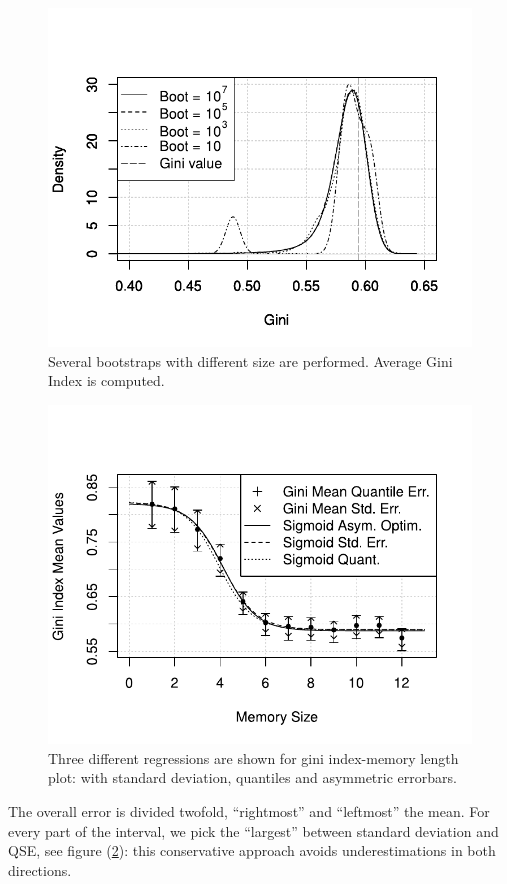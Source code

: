 \begin{figure}[h!]
  \centering
  \includegraphics[width=.8\columnwidth]{img/bootstrap.pdf}
  \caption{Several bootstraps with different size are performed. Average Gini Index is computed.}
  \label{fig:bootstrap}
\end{figure}
\begin{figure}[h!]
  \centering
  \includegraphics[width=.8\columnwidth]{img/appendix.pdf}
  \caption{Three different regressions are shown for gini index-memory length plot: with standard deviation, quantiles and asymmetric errorbars.}
  \label{fig:gausssigma}
\end{figure}
The overall error is divided twofold, ``rightmost'' and ``leftmost''
the mean. For every part of the interval, we pick the ``largest''
between standard deviation and QSE, see figure (\ref{fig:gausssigma}): this conservative approach avoids
underestimations in both directions.

